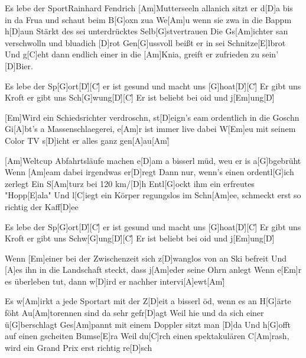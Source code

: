 \documentclass[../main.tex]{subfiles}
\begin{document}
\begin{song}[7]{Es lebe der Sport}{Rainhard Fendrich}{}
[Am]Mutterseeln allanich sitzt er d[D]a bis in da Frua und schaut beim B[G]oxn zua
We[Am]u wenn sie zwa in die Bappm h[D]aun
Stärkt des sei unterdrücktes Selb[G]stvertrauen
Die Gs[Am]ichter san verschwolln und bluadich [D]rot
Gen[G]ussvoll beißt er in sei Schnitze[E]lbrot
Und g[C]eht dann endlich einer in die [Am]Knia, greift er zufrieden zu sein' [D]Bier.

Es lebe der Sp[G]ort[D]{\h}[C]{\h}
er ist gesund und macht uns [G]hoat[D]{\h}[C]{\h}
Er gibt uns Kroft er gibt uns Sch[G]wung[D]{\h}[C]{\h}
Er ist beliebt bei oid und j[Em]ung[D]{\h}

[Em]Wird ein Schiedsrichter verdroschn, st[D]eign's eam ordentlich in die Goschn
Gi[A]bt's a Massenschlaegerei, e[Am]r ist immer live dabei
W[Em]eu mit seinem Color TV s[D]icht er alles ganz gen[A]au[Am]{\h}

[Am]Weltcup Abfahrtsläufe machen e[D]am a bisserl müd, weu er is a[G]bgebrüht
Wenn [Am]eam dabei irgendwas er[D]regt
Dann nur, wenn's einen ordentl[G]ich zerlegt
Ein S[Am]turz bei 120 km/[D]h
Entl[G]ockt ihm ein erfreutes "Hopp[E]ala"
Und l[C]iegt ein Körper regungslos im Schn[Am]ee, schmeckt erst so richtig der Kaff[D]ee

Es lebe der Sp[G]ort[D]{\h}[C]{\h}
er ist gesund und macht uns [G]hoat[D]{\h}[C]{\h}
Er gibt uns Kroft er gibt uns Schw[G]ung[D]{\h}[C]{\h}
Er ist beliebt bei oid und j[Em]ung[D]{\h}

Wenn [Em]einer bei der Zwischenzeit sich z[D]wanglos von an Ski befreit
Und [A]es ihn in die Landschaft steckt, dass j[Am]eder seine Ohrn anlegt
Wenn e[Em]r es überleben tut, dann w[D]ird er nachher intervi[A]ewt[Am]{\h}

Es w[Am]irkt a jede Sportart mit der Z[D]eit a bisserl öd, wenn es an H[G]{ä}rte föht
Au[Am]torennen sind da sehr gefr[D]agt
Weil hie und da sich einer ü[G]berschlagt
Ges[Am]pannt mit einem Doppler sitzt man [D]da
Und h[G]offt auf einen gscheiten Bumse[E]ra
Weil du[C]rch einen spektakulären C[Am]rash, wird ein Grand Prix erst richtig re[D]sch

\end{song}
\end{document}
